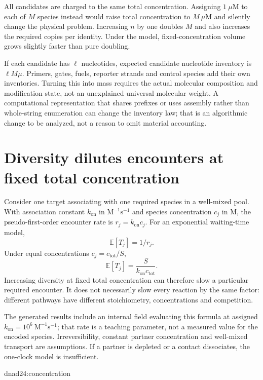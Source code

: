 All candidates are charged to the same total concentration. Assigning
$1\ \mu\mathrm M$ to each of $M$ species instead would raise total concentration
to $M\ \mu\mathrm M$ and silently change the physical problem. Increasing $n$ by
one doubles $M$ and also increases the required copies per identity. Under the
model, fixed-concentration volume grows slightly faster than pure doubling.

If each candidate has $\ell$ nucleotides, expected candidate nucleotide inventory
is $\ell M\mu$. Primers, gates, fuels, reporter strands and control species add
their own inventories. Turning this into mass requires the actual molecular
composition and modification state, not an unexplained universal molecular weight.
A computational representation that shares prefixes or uses assembly rather than
whole-string enumeration can change the inventory law; that is an algorithmic
change to be analyzed, not a reason to omit material accounting.

\section{Diversity dilutes encounters at fixed total concentration}
Consider one target associating with one required species in a well-mixed pool.
With association constant $k_{\mathrm{on}}$ in
$\mathrm{M}^{-1}\mathrm{s}^{-1}$ and species concentration $c_j$ in M,
the pseudo-first-order encounter rate is $r_j=k_{\mathrm{on}}c_j$.
For an exponential waiting-time model,
\[
\mathbb E[T_j]=1/r_j.
\]
Under equal concentrations $c_j=c_{\mathrm{tot}}/S$,
\begin{equation}
\mathbb E[T_j]=\frac{S}{k_{\mathrm{on}}c_{\mathrm{tot}}}.
\label{dnad24:wait}
\end{equation}
Increasing diversity at fixed total concentration can therefore slow a particular
required encounter. It does not necessarily slow every reaction by the same factor:
different pathways have different stoichiometry, concentrations and competition.

The generated results include an internal field evaluating this formula at assigned
$k_{\mathrm{on}}=10^6\ \mathrm{M}^{-1}\mathrm{s}^{-1}$; that rate is a teaching
parameter, not a measured value for the encoded species. Irreversibility,
constant partner concentration and well-mixed transport are assumptions. If a
partner is depleted or a contact dissociates, the one-clock model is insufficient.

{dnad24:concentration}


